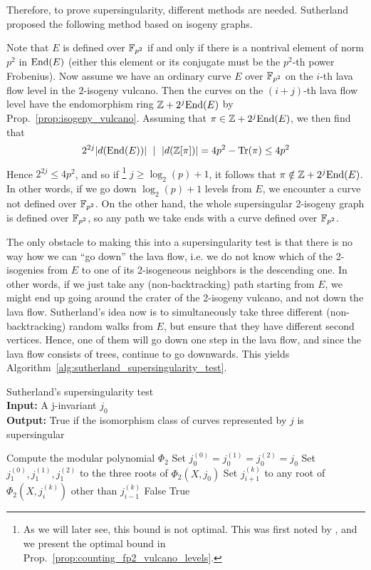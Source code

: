Therefore, to prove supersingularity, different methods are needed.
Sutherland \cite{sutherland_supersingularity_test} proposed the following method based on isogeny graphs.

Note that $E$ is defined over $\mathbb{F}_{p^2}$ if and only if there is a nontrival element of norm $p^2$ in $\mathrm{End}(E)$ (either this element or its conjugate must be the $p^2$-th power Frobenius).
Now assume we have an ordinary curve $E$ over $\mathbb{F}_{p^2}$ on the $i$-th lava flow level in the $2$-isogeny vulcano.
Then the curves on the $(i + j)$-th lava flow level have the endomorphism ring $\mathbb{Z} + 2^j\mathrm{End}(E)$ by Prop.~\ref{prop:isogeny_vulcano}.
Assuming that $\pi \in \mathbb{Z} + 2^j\mathrm{End}(E)$, we then find that
\begin{equation*}
    2^{2j} |d(\mathrm{End}(E))| \ \mid \  |d(\mathbb{Z}[\pi])| = 4p^2 - \mathrm{Tr}(\pi) \leq 4p^2
\end{equation*}
Hence $2^{2j} \leq 4p^2$, and so if
\footnote{As we will later see, this bound is not optimal. This was first noted by \cite{fp_supersingularity_tests}, and we present the optimal bound in Prop.~\ref{prop:counting_fp2_vulcano_levels}.}
$j \geq \log_2(p) + 1$, it follows that $\pi \notin \mathbb{Z} + 2^j\mathrm{End}(E)$.
In other words, if we go down $\log_2(p) + 1$ levels from $E$, we encounter a curve not defined over $\mathbb{F}_{p^2}$.
On the other hand, the whole supersingular 2-isogeny graph is defined over $\mathbb{F}_{p^2}$, so any path we take ends with a curve defined over $\mathbb{F}_{p^2}$.

The only obstacle to making this into a supersingularity test is that there is no way how we can ``go down'' the lava flow, i.e. we do not know which of the 2-isogenies from $E$ to one of its 2-isogeneous neighbors is the descending one.
In other words, if we just take any (non-backtracking) path starting from $E$, we might end up going around the crater of the 2-isogeny vulcano, and not down the lava flow.
Sutherland's idea now is to simultaneously take three different (non-backtracking) random walks from $E$, but ensure that they have different second vertices.
Hence, one of them will go down one step in the lava flow, and since the lava flow consists of trees, continue to go downwards.
This yields Algorithm~\ref{alg:sutherland_supersingularity_test}.
\begin{algorithm}
\caption{\label{alg:sutherland_supersingularity_test} Sutherland's supersingularity test\\
\textbf{Input:} A j-invariant $j_0$\\
\textbf{Output:} True if the isomorphism class of curves represented by $j$ is supersingular}
\begin{algorithmic}[1]
\State Compute the modular polynomial $\Phi_2$
\State Set $j_0^{(0)} = j_0^{(1)} = j_0^{(2)} = j_0$
\State Set $j_1^{(0)}, j_1^{(1)}, j_1^{(2)}$ to the three roots of $\Phi_2(X, j_0)$
        \State Set $j_{i + 1}^{(k)}$ to any root of $\Phi_2(X, j_i^{(k)})$ other than $j_{i - 1}^{(k)}$
            \Return False
        \EndIf
    \EndFor
\EndFor
\State \Return True
\end{algorithmic}
\end{algorithm}

